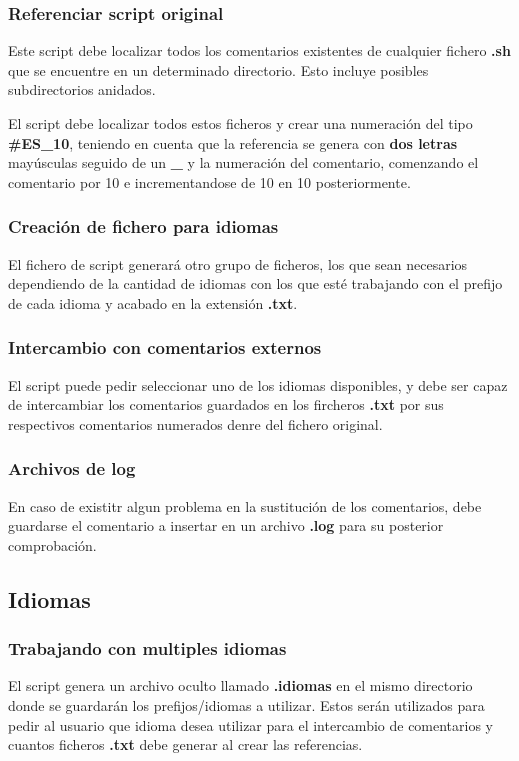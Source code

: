 \documentclass{article}
\begin{document}
        \subsubsection{Referenciar script original}
            Este script debe localizar todos los comentarios existentes de cualquier fichero \textbf{.sh} que se encuentre en un determinado directorio. Esto incluye posibles subdirectorios anidados.
    
            El script debe localizar todos estos ficheros y crear una numeración del tipo \textbf{\#ES\_10}, teniendo en cuenta que la referencia se genera con \textbf{dos letras} mayúsculas seguido de un \textbf{\_} y la numeración del comentario, comenzando el comentario por 10 e incrementandose de 10 en 10 posteriormente.
            
        \subsubsection{Creación de fichero para idiomas}
            El fichero de script generará otro grupo de ficheros, los que sean necesarios dependiendo de la cantidad de idiomas con los que esté trabajando con el prefijo de cada idioma y acabado en la extensión \textbf{.txt}.
        
        \subsubsection{Intercambio con comentarios externos}
            El script puede pedir seleccionar uno de los idiomas disponibles, y debe ser capaz de intercambiar los comentarios guardados en los fircheros \textbf{.txt} por sus respectivos comentarios numerados denre del fichero original.
        
        \subsubsection{Archivos de log}
            En caso de existitr algun problema en la sustitución de los comentarios, debe guardarse el comentario a insertar en un archivo \textbf{.log} para su posterior comprobación.
        
    \subsection{Idiomas}
        \subsubsection{Trabajando con multiples idiomas}
            El script genera un archivo oculto llamado \textbf{.idiomas} en el mismo directorio donde se guardarán los prefijos/idiomas a utilizar. Estos serán utilizados para pedir al usuario que idioma desea utilizar para el intercambio de comentarios y cuantos ficheros \textbf{.txt} debe generar al crear las referencias.
\end{document}
